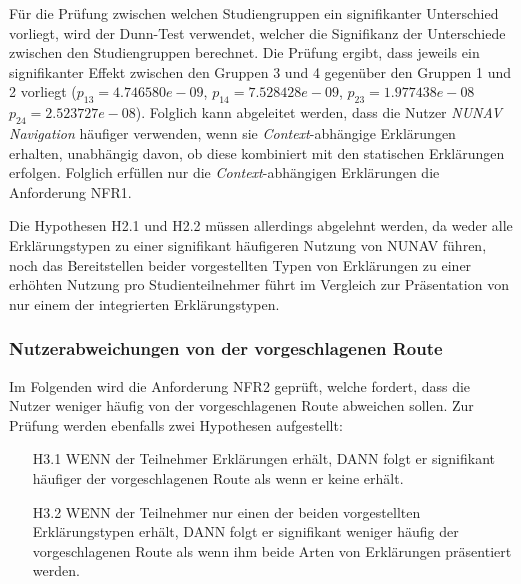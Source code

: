 Für die Prüfung zwischen welchen Studiengruppen ein signifikanter Unterschied vorliegt, wird der Dunn-Test \cite{dunn1964multiple} verwendet, welcher die Signifikanz der Unterschiede zwischen den Studiengruppen berechnet. Die Prüfung ergibt, dass jeweils ein signifikanter Effekt zwischen den Gruppen 3 und 4 gegenüber den Gruppen 1 und 2 vorliegt ($ p_{13} = 4.746580e-09 $, $ p_{14} = 7.528428e-09 $, $ p_{23} = 1.977438e-08 $ $ p_{24} = 2.523727e-08 $). Folglich kann abgeleitet werden, dass die Nutzer \textit{NUNAV Navigation} häufiger verwenden, wenn sie \textit{Context}-abhängige Erklärungen erhalten, unabhängig davon, ob diese kombiniert mit den statischen Erklärungen erfolgen. Folglich erfüllen nur die \textit{Context}-abhängigen Erklärungen die Anforderung NFR1.

Die Hypothesen H2.1 und H2.2 müssen allerdings abgelehnt werden, da weder alle Erklärungstypen zu einer signifikant häufigeren Nutzung von NUNAV führen, noch das Bereitstellen beider vorgestellten Typen von Erklärungen zu einer erhöhten Nutzung pro Studienteilnehmer führt im Vergleich zur Präsentation von nur einem der integrierten Erklärungstypen. 

\subsubsection{Nutzerabweichungen von der vorgeschlagenen Route}

Im Folgenden wird die Anforderung NFR2 geprüft, welche fordert, dass die Nutzer weniger häufig von der vorgeschlagenen Route abweichen sollen. Zur Prüfung werden ebenfalls zwei Hypothesen aufgestellt:

\begin{enumerate}
    \item[H3.1] WENN der Teilnehmer Erklärungen erhält, DANN folgt er signifikant häufiger der vorgeschlagenen Route als wenn er keine erhält.
    \item[H3.2] WENN der Teilnehmer nur einen der beiden vorgestellten Erklärungstypen erhält, DANN folgt er signifikant weniger häufig der vorgeschlagenen Route als wenn ihm beide Arten von Erklärungen präsentiert werden.
\end{enumerate}

